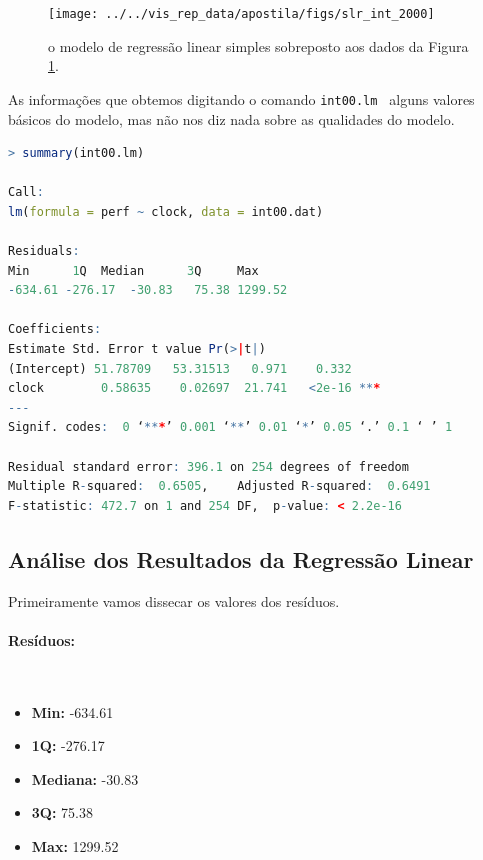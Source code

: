\documentclass[article]{memoir}
\begin{document}
{\begin{figure}[ht]
	\centering
	\texttt{[image: ../../vis\_rep\_data/apostila/figs/slr\_int\_2000]}
	\caption{o modelo de regressão linear simples sobreposto aos dados 		da Figura 	\ref{fig:slrint2000}.}
	\label{fig:slrint2000}
\end{figure}


As informações que obtemos digitando o comando \texttt{int00.lm } alguns valores básicos do modelo, mas não nos diz nada sobre as qualidades do modelo. 

\begin{lstlisting}[language={R}, caption={apresentação dos resultados do comando \texttt{summary(int00.lm)}.}, label={lst:result_summary_slr}]
> summary(int00.lm)

Call:
lm(formula = perf ~ clock, data = int00.dat)

Residuals:
Min      1Q  Median      3Q     Max 
-634.61 -276.17  -30.83   75.38 1299.52 

Coefficients:
Estimate Std. Error t value Pr(>|t|)    
(Intercept) 51.78709   53.31513   0.971    0.332    
clock        0.58635    0.02697  21.741   <2e-16 ***
---
Signif. codes:  0 ‘***’ 0.001 ‘**’ 0.01 ‘*’ 0.05 ‘.’ 0.1 ‘ ’ 1

Residual standard error: 396.1 on 254 degrees of freedom
Multiple R-squared:  0.6505,    Adjusted R-squared:  0.6491 
F-statistic: 472.7 on 1 and 254 DF,  p-value: < 2.2e-16

\end{lstlisting}

\subsection{Análise dos Resultados da Regressão Linear}

Primeiramente vamos dissecar os valores dos resíduos.

\paragraph*{Resíduos:}\mbox{}\\
\begin{itemize}
	\item \textbf{Min:} -634.61
	\item \textbf{1Q:} -276.17
	\item \textbf{Mediana:} -30.83
	\item \textbf{3Q:} 75.38
	\item \textbf{Max:} 1299.52
\end{itemize}

}
\end{document}
